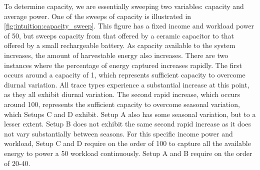 To determine capacity, we are essentially sweeping two variables: capacity and average power.
One of the sweeps of capacity is illustrated in \cref{fig:intuition:capacity_sweep}. 
This figure has a fixed income and workload power of 50\ssi{\micro\watt}, but sweeps capacity from that offered by a ceramic capacitor to that offered by a small rechargeable battery.
As capacity available to the system increases, the amount of harvestable energy also increases.
There are two instances where the percentage of energy captured increases rapidly. The first occurs around a capacity of 1\ssi{\milli\Wh}, which represents sufficient capacity to overcome diurnal variation. All trace types experience a substantial increase at this point, as they all exhibit diurnal variation. 
The second rapid increase, which occurs around 100\ssi{\milli\Wh}, represents the sufficient capacity to overcome seasonal variation, which Setups C and D exhibit. Setup A also has some seasonal variation, but to a lesser extent. Setup B does not exhibit the same second rapid increase as it does not vary substantially between seasons.
For this specific income power and workload, Setup C and D require on the order of 100\ssi{\milli\Wh} to capture all the available energy to power a 50\ssi{\micro\watt} workload continuously. Setup A and B require on the order of 20-40\ssi{\milli\Wh}.


